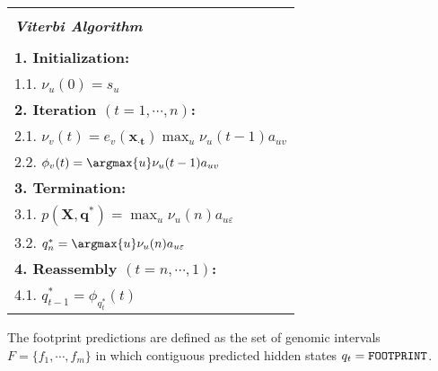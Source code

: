 \begin{center}
  \begin{spacing}{1.0}
    \begin{tabular}{l}
      \hline \\[-0.25cm]
      \hspace{1.2cm} {\large {\bf \emph{ Viterbi Algorithm } } } \hspace{1.2cm} \\[0.1cm]
      \hline \\[-0.25cm]
      \hspace{0.2cm} {\bf 1. Initialization:} \\
      \hspace{0.9cm} 1.1. $ \nu_u(0) = s_u $ \\
      \hspace{0.2cm} {\bf 2. Iteration $ (t = 1, \cdots, n) $:} \\
      \hspace{0.9cm} 2.1. $ \nu_v(t) = e_v(\mathbf{{x}_{\cdot t}}) \max_{u} \nu_u(t-1)a_{uv} $ \\
      \hspace{0.9cm} 2.2. $ {\phi}_{v}(t) = \argmax{u} \nu_u(t-1) a_{uv} $ \\
      \hspace{0.2cm} {\bf 3. Termination:} \\
      \hspace{0.9cm} 3.1. $ p(\mathbf{X},\mathbf{q^*}) = \max_{u} \nu_u(n) a_{u\varepsilon} $ \\
      \hspace{0.9cm} 3.2. $ q_{n}^{\ast} = \argmax{u} \nu_u(n) a_{u\varepsilon} $ \\
      \hspace{0.2cm} {\bf 4. Reassembly $ (t = n, \cdots, 1) $:} \\
      \hspace{0.9cm} 4.1. $ q_{t-1}^{\ast} = {\phi}_{q_{t}^{\ast}}(t) $ \\[0.1cm]
      \hline
    \end{tabular}
  \end{spacing}
\end{center}

The footprint predictions are defined as the set of genomic intervals $F = \{ {f}_{1}, \cdots, {f}_{m} \}$ in which contiguous predicted hidden states $ q_t = \text{{\tt FOOTPRINT}} $.

